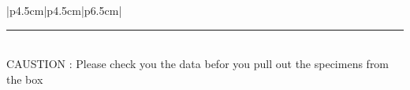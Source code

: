 \documentclass{article}
\newcommand*{\Data}[1]{%
  
    #1\\ 
    \hline
}%
\begin{document}
\fancyheadoffset{0pt}%


\begin{MyTabularX}{|p{4.5cm}|p{4.5cm}|p{6.5cm}|}


\end{MyTabularX}

\textcolor{black}{\rule{17cm}{1mm}} \\
CAUSTION : Please check you the data befor you pull out the specimens from the box
  
\end{document}
